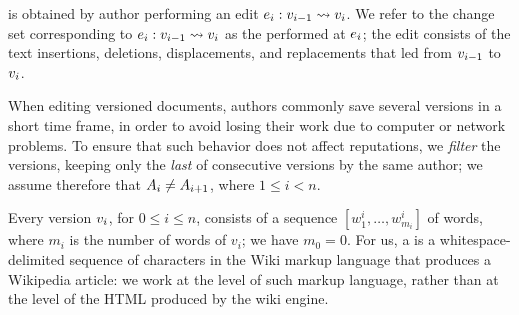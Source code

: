 is obtained by author  performing an
edit $e_{i}: v_{i-1} \rightsquigarrow v_{i}$.
We refer to the change set corresponding to
$e_{i}: v_{i-1} \rightsquigarrow v_{i}$
as the  performed at $e_{i}$; the edit consists of the text
insertions, deletions, displacements, and replacements that led from
$v_{i-1}$ to $v_{i}$.

When editing versioned documents, authors commonly save several
versions in a short time frame, in order to avoid losing their work
due to computer or network problems.
To ensure that such behavior does not affect reputations, we
\textit{filter} the versions, keeping only the \textit{last} of consecutive
versions by the same author; we assume therefore that
$A_{i} \neq A_{i+1}$,
where $1 \leq i < n$.

Every version $v_{i}$, for $0 \leq i \leq n$, consists of a sequence
$[w^i_1, \ldots, w^i_{m_i}]$ of words, where $m_i$ is the number of
words of $v_i$; we have $m_0 = 0$.
For us, a  is a whitespace-delimited sequence of
characters in the Wiki markup language that produces a Wikipedia article:
we work at the level of such markup language, rather than at the level
of the HTML produced by the wiki engine.

